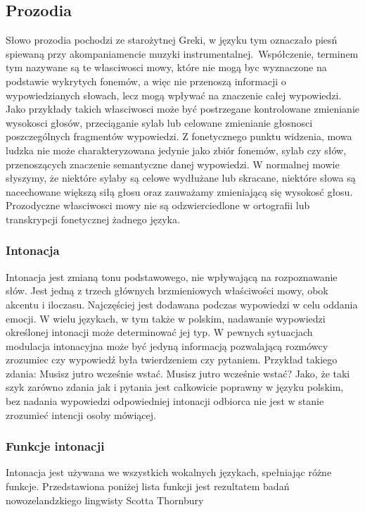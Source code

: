 \documentclass[a4paper,12 pt]{article}
\begin{document}
\subsection{Prozodia}
Słowo prozodia pochodzi ze starożytnej Greki, w języku tym oznaczało piesń spiewaną przy akompaniamencie muzyki instrumentalnej.~\cite{pros}Współczenie, terminem tym nazywane są te własciwosci mowy, które nie mogą byc wyznaczone na podstawie wykrytych fonemów, a więc nie przenoszą informacji o wypowiedzianych słowach, lecz mogą wpływać na znaczenie całej wypowiedzi. Jako przykłady takich własciwosci może być postrzegane kontrolowane zmienianie wysokosci głosów, przeciąganie sylab lub celowane zmienianie głosnosci poszczególnych fragmentów wypowiedzi.
Z fonetycznego punktu widzenia, mowa ludzka nie może charakteryzowana jedynie jako zbiór fonemów, sylab czy słów, przenoszących znaczenie semantyczne danej wypowiedzi. W normalnej mowie słyszymy, że niektóre sylaby są celowe wydłużane lub skracane, niektóre słowa są nacechowane większą siłą głosu oraz zauważamy zmieniającą się wysokosć głosu.
Prozodyczne własciwosci mowy nie są odzwierciedlone w ortografii lub transkrypcji fonetycznej żadnego języka.
\subsubsection{Intonacja}
Intonacja jest zmianą tonu podstawowego, nie wpływającą na rozpoznawanie słów. Jest jedną z trzech głównych brzmieniowych właściwości mowy, obok akcentu i iloczasu. Najczęściej jest dodawana podczas wypowiedzi w celu oddania emocji. W wielu językach, w tym także w polskim, nadawanie wypowiedzi określonej intonacji może determinować jej typ. W pewnych sytuacjach modulacja intonacyjna może być jedyną informacją pozwalającą rozmówcy zrozumiec czy wypowiedź była twierdzeniem czy pytaniem. 
Przykład takiego zdania:
\newline Musisz jutro wcześnie wstać.
\newline Musisz jutro wcześnie wstać?
\newline Jako, że taki szyk zarówno zdania jak i pytania jest całkowicie poprawny w języku polskim, bez nadania wypowiedzi odpowiedniej intonacji odbiorca nie jest w stanie zrozumieć intencji osoby mówiącej.
\subsubsection{Funkcje intonacji}
Intonacja jest używana we wszystkich wokalnych językach, spełniając różne funkcje. 
Przedstawiona poniżej lista funkcji jest rezultatem badań nowozelandzkiego lingwisty Scotta Thornbury ~\cite{TS} 
\end{document}
